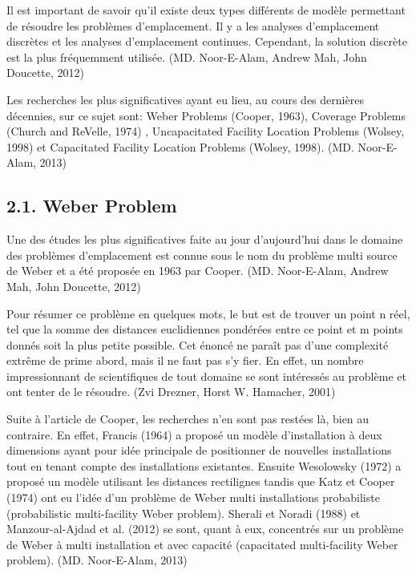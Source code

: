 Il est important de savoir qu'il existe deux types différents de modèle permettant de résoudre les problèmes d'emplacement. Il y a les analyses d'emplacement discrètes et les analyses d'emplacement continues. Cependant, la solution discrète est la plus fréquemment utilisée. (MD. Noor-E-Alam, Andrew Mah, John Doucette, 2012)

\bigskip

Les recherches les plus significatives ayant eu lieu, au cours des dernières décennies, sur ce sujet sont: Weber Problems (Cooper, 1963), Coverage Problems (Church and ReVelle, 1974) , Uncapacitated Facility Location Problems (Wolsey, 1998) et Capacitated Facility Location Problems (Wolsey, 1998). (MD. Noor-E-Alam, 2013)


\subsection*{2.1. Weber Problem}

\bigskip

Une des études les plus significatives faite au jour d'aujourd'hui dans le domaine des problèmes d'emplacement est connue sous le nom du problème multi source de Weber et a été proposée en 1963 par Cooper. (MD. Noor-E-Alam, Andrew Mah, John Doucette, 2012)

\bigskip

Pour résumer ce problème en quelques mots, le but est de trouver un point n réel, tel que la somme des distances euclidiennes pondérées entre ce point et m points donnés soit la plus petite possible. Cet énoncé ne paraît pas d'une complexité extrême de prime abord, mais il ne faut pas s'y fier. En effet, un nombre impressionnant de scientifiques de tout domaine se sont intéressés au problème et ont tenter de le résoudre. (Zvi Drezner, Horst W. Hamacher, 2001)

\bigskip

Suite à l'article de Cooper, les recherches n'en sont pas restées là, bien au contraire. En effet, Francis (1964) a proposé un modèle d'installation à deux dimensions ayant pour idée principale de positionner de nouvelles installations tout en tenant compte des installations existantes. Ensuite Wesolowsky (1972) a proposé un modèle utilisant les distances rectilignes tandis que Katz et Cooper (1974) ont eu l'idée d'un problème de Weber multi installations probabiliste (probabilistic multi-facility Weber problem). Sherali et Noradi (1988) et Manzour-al-Ajdad et al. (2012) se sont, quant à eux, concentrés sur un problème de Weber à multi installation et avec capacité (capacitated multi-facility Weber problem). (MD. Noor-E-Alam, 2013)

